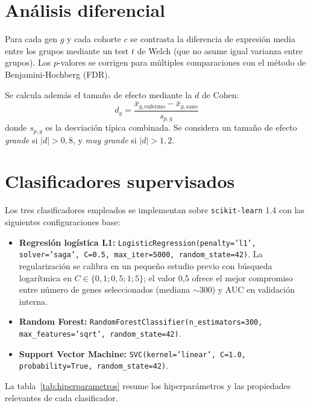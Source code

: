 \section{Análisis diferencial}
\label{sec:diferencial}

Para cada gen $g$ y cada cohorte $c$ se contrasta la diferencia de
expresión media entre los grupos mediante un test $t$ de Welch (que no
asume igual varianza entre grupos). Los $p$-valores se corrigen para
múltiples comparaciones con el método de Benjamini-Hochberg (FDR).

Se calcula además el tamaño de efecto mediante la $d$ de Cohen:
\begin{equation}
  d_g = \frac{\bar{x}_{g,\text{enfermo}} - \bar{x}_{g,\text{sano}}}{s_{p,g}}
\end{equation}
donde $s_{p,g}$ es la desviación típica combinada. Se considera un tamaño
de efecto \emph{grande} si $|d| > 0{,}8$, y \emph{muy grande} si
$|d| > 1{,}2$.

\section{Clasificadores supervisados}
\label{sec:clasificadores}

Los tres clasificadores empleados se implementan sobre \texttt{scikit-learn}
1.4 con las siguientes configuraciones base:

\begin{itemize}
  \item \textbf{Regresión logística L1:}
  \texttt{LogisticRegression(penalty='l1', solver='saga', C=0.5,
  max\_iter=5000, random\_state=42)}. La regularización se calibra en un
  pequeño estudio previo con búsqueda logarítmica en $C \in \{0{,}1;
  0{,}5; 1; 5\}$; el valor 0,5 ofrece el mejor compromiso entre número de
  genes seleccionados (mediana $\sim$300) y AUC en validación interna.
  \item \textbf{Random Forest:}
  \texttt{RandomForestClassifier(n\_estimators=300, max\_features='sqrt',
  random\_state=42)}.
  \item \textbf{Support Vector Machine:}
  \texttt{SVC(kernel='linear', C=1.0, probability=True, random\_state=42)}.
\end{itemize}

La tabla~\ref{tab:hiperparametros} resume los hiperparámetros y las
propiedades relevantes de cada clasificador.


